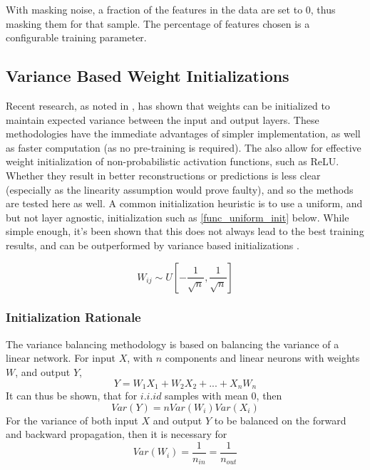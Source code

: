 \documentclass[a4paper,11pt,oneside]{article}
\theoremstyle{plain}
\theoremstyle{definition}
\begin{document}
With masking noise, a fraction of the features in the data are set to 0, thus masking them for that sample. The percentage of features chosen is a configurable training parameter.

\subsection{Variance Based Weight Initializations}\label{imp_weights}

Recent research, as noted in \cite{He}, has shown that weights can be initialized to maintain expected variance between the input and output layers. These methodologies have the immediate advantages of simpler implementation, as well as faster computation (as no pre-training is required). The also allow for effective weight initialization of non-probabilistic activation functions, such as ReLU. Whether they result in better reconstructions or predictions is less clear (especially as the linearity assumption would prove faulty), and so the methods are tested here as well. 
\newline\newline
A common initialization heuristic is to use a uniform, and but not layer agnostic, initialization such as \ref{func_uniform_init} below. While simple enough, it's been shown that this does not always lead to the best training results, and can be outperformed by variance based initializations \cite{Glorot}.

\begin{equation}\label{func_uniform_init}
W_{i j} \sim U\left[-\frac{1}{\sqrt{n}}, \frac{1}{\sqrt{n}}\right]
\end{equation}

\subsubsection{Initialization Rationale}

The variance balancing methodology is based on balancing the variance of a linear network. For input $X$, with $n$ components and linear neurons with weights $W$, and output $Y$,
\begin{equation}
Y = W_1X_1 + W_2X_2 + ... + X_nW_n
\end{equation}
It can thus be shown, that for $i.i.id$ samples with mean $0$, then
\begin{equation}
Var(Y) = nVar(W_i)Var(X_i)
\end{equation}
For the variance of both input $X$ and output $Y$ to be balanced on the forward and backward propagation, then it is necessary for
\begin{equation}
Var(W_i) = \frac{1}{n_{in}}= \frac{1}{n_{out}}
\end{equation}
\end{document}

